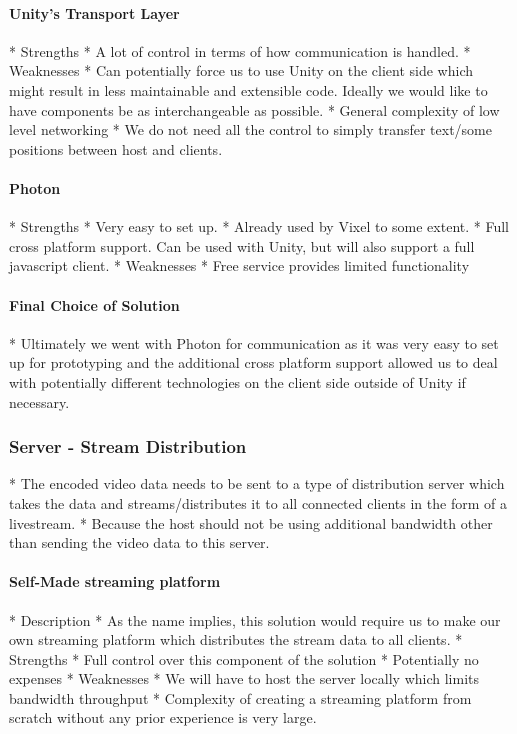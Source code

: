 \paragraph{Unity's Transport Layer}
    * Strengths
        * A lot of control in terms of how communication is handled.
    * Weaknesses
        * Can potentially force us to use Unity on the client side which might result in less maintainable and extensible code. Ideally we would like to have components be as interchangeable as possible.  
        * General complexity of low level networking
        * We do not need all the control to simply transfer text/some positions between host and clients. 
\paragraph{Photon}
    * Strengths
        * Very easy to set up.
        * Already used by Vixel to some extent. 
        * Full cross platform support. Can be used with Unity, but will also support a full javascript client.
    * Weaknesses
        * Free service provides limited functionality 

\paragraph{Final Choice of Solution}
    * Ultimately we went with Photon for communication as it was very easy to set up for prototyping and the additional cross platform support allowed us to deal with potentially different technologies on the client side outside of Unity if necessary. 

\subsubsection{Server - Stream Distribution} %
    * The encoded video data needs to be sent to a type of distribution server which takes the data and streams/distributes it to all connected clients in the form of a livestream.
        * Because the host should not be using additional bandwidth other than sending the video data to this server. 
\paragraph{Self-Made streaming platform}
    * Description
        * As the name implies, this solution would require us to make our own streaming platform which distributes the stream data to all clients. 
    * Strengths
        * Full control over this component of the solution
        * Potentially no expenses
    * Weaknesses
        * We will have to host the server locally which limits bandwidth throughput
        * Complexity of creating a streaming platform from scratch without any prior experience is very large. 
